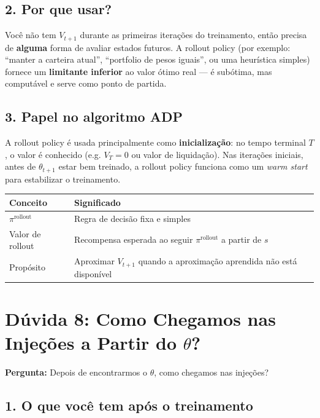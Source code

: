 \documentclass[12pt,a4paper]{article}
\begin{document}
\subsection{2. Por que usar?}

Você não tem $V_{t+1}$ durante as primeiras iterações do treinamento, então precisa de \textbf{alguma} forma de avaliar estados futuros. A rollout policy (por exemplo: ``manter a carteira atual'', ``portfolio de pesos iguais'', ou uma heurística simples) fornece um \textbf{limitante inferior} ao valor ótimo real --- é subótima, mas computável e serve como ponto de partida.

\subsection{3. Papel no algoritmo ADP}

A rollout policy é usada principalmente como \textbf{inicialização}: no tempo terminal $T$, o valor é conhecido (e.g. $V_T = 0$ ou valor de liquidação). Nas iterações iniciais, antes de $\theta_{t+1}$ estar bem treinado, a rollout policy funciona como um \textit{warm start} para estabilizar o treinamento.

\begin{center}
\begin{tabular}{ll}
\hline
\textbf{Conceito} & \textbf{Significado} \\
\hline
$\pi^{\text{rollout}}$ & Regra de decisão fixa e simples \\
Valor de rollout & Recompensa esperada ao seguir $\pi^{\text{rollout}}$ a partir de $s$ \\
Propósito & Aproximar $V_{t+1}$ quando a aproximação aprendida não está disponível \\
\hline
\end{tabular}
\end{center}

\section{Dúvida 8: Como Chegamos nas Injeções a Partir do \texorpdfstring{$\theta$}{theta}?}

\textbf{Pergunta:} Depois de encontrarmos o $\theta$, como chegamos nas injeções?

\subsection{1. O que você tem após o treinamento}
\end{document}

